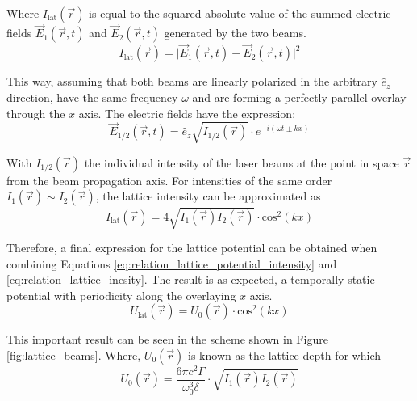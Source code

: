 Where $I_\text{lat}(\vec{r})$ is equal to the squared absolute value of the summed electric fields $\vec{E}_1(\vec{r}, t)$ and $\vec{E}_2(\vec{r}, t)$ generated by the two beams. 
\begin{equation}\label{eq:relation_lattice_inesity_fields}
	I_{\text{lat}}(\vec{r}) = \mathopen\big|\vec{E}_1(\vec{r}, t)+\vec{E}_2(\vec{r}, t)\mathclose\big|^2
\end{equation}

This way, assuming that both beams are linearly polarized in the arbitrary $\hat{e}_z$ direction, have the same frequency $\omega$ and are forming a perfectly parallel overlay through the $x$ axis. The electric fields have the expression:
\begin{equation}\label{eq:relation_electric_fields}
	\vec{E}_{1/2}(\vec{r}, t) = \hat{e}_z \sqrt{I_{1/2}(\vec{r})}\cdot e^{-i(\omega t \pm kx)}
\end{equation}

With $I_{1/2}(\vec{r})$ the individual intensity of the laser beams at the point in space $\vec{r}$ from the beam propagation axis. For intensities of the same order $I_{1}(\vec{r}) \sim I_{2}(\vec{r})$, the lattice intensity can be approximated as
\begin{equation}\label{eq:relation_lattice_inesity}
	I_{\text{lat}}(\vec{r}) = 4\sqrt{I_{1}(\vec{r})I_{2}(\vec{r})} \cdot \text{cos}^2(kx)
\end{equation}

Therefore, a final expression for the lattice potential can be obtained when combining Equations \eqref{eq:relation_lattice_potential_intensity} and \eqref{eq:relation_lattice_inesity}. The result is as expected, a temporally static potential with periodicity along the overlaying $x$ axis.
\begin{equation}\label{eq:relation_lattice_potential}
	U_{\text{lat}}(\vec{r}) = U_{0}(\vec{r}) \cdot \text{cos}^2(kx)
\end{equation} 

This important result can be seen in the scheme shown in Figure \ref{fig:lattice_beams}. Where, $U_{0}(\vec{r})$ is known as the lattice depth for which
\begin{equation}\label{eq:relation_lattice_potential_depth}
	U_{0}(\vec{r}) = \frac{6\pi c^2 \Gamma}{\omega_0^3 \delta} \cdot \sqrt{I_{1}(\vec{r})I_{2}(\vec{r})}
\end{equation} 

